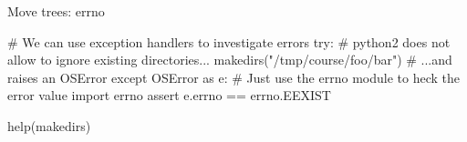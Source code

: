 \begin{pyframe}{Move trees: errno}
\begin{pythoncode}

# We can use exception handlers to investigate errors
try:
    # python2 does not allow to ignore existing directories...
    makedirs("/tmp/course/foo/bar")
    #  ...and raises an OSError
except OSError as e:
    # Just use the errno module to heck the error value
    import errno
    assert e.errno == errno.EEXIST
    
help(makedirs)
\end{pythoncode}
\end{pyframe}

